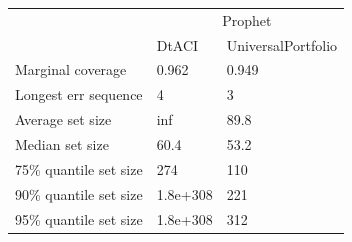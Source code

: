 \begin{tabular}{lll}
\toprule
& \multicolumn{2}{c}{Prophet} \\
& DtACI & UniversalPortfolio \\
\midrule
Marginal coverage & 0.962 & 0.949 \\
Longest err sequence & 4 & 3 \\
Average set size & inf & 89.8 \\
Median set size & 60.4 & 53.2 \\
75\% quantile set size & 274 & 110 \\
90\% quantile set size & 1.8e+308 & 221 \\
95\% quantile set size & 1.8e+308 & 312 \\
\bottomrule
\end{tabular}
